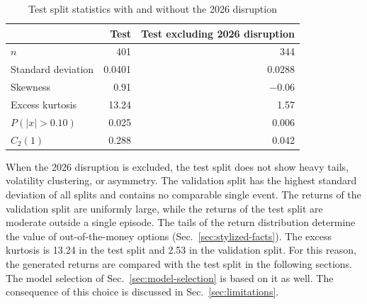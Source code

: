 \begin{table}[H]
\centering
\begin{tabular}{lrr}
\toprule
 & Test & Test excluding 2026 disruption \\
\midrule
$n$                &  \num{401}     &  \num{344} \\
Standard deviation &  \num{0.0401} &  \num{0.0288} \\
Skewness           &  \num{0.91}   &  \num{-0.06} \\
Excess kurtosis    &  \num{13.24}   &  \num{1.57} \\
$P(|x| > 0.10)$    &  \num{0.025}  &  \num{0.006} \\
$C_2(1)$           &  \num{0.288}  &  \num{0.042} \\
\bottomrule
\end{tabular}
\caption{Test split statistics with and without the 2026 disruption}
\label{tab:test-spike}
\end{table}

When the 2026 disruption is excluded, the test split does not show heavy tails, volatility clustering, or asymmetry. The validation split has the highest standard deviation of all splits and contains no comparable single event. The returns of the validation split are uniformly large, while the returns of the test split are moderate outside a single episode. 
The tails of the return distribution determine the value of out-of-the-money options (Sec.~\ref{sec:stylized-facts}). 
The excess kurtosis is \num{13.24} in the test split and \num{2.53} in the validation split. For this reason, the generated returns are compared with the test split in the following sections. The model selection of Sec.~\ref{sec:model-selection} is based on it as well. The consequence of this choice is discussed in Sec.~\ref{sec:limitations}.
